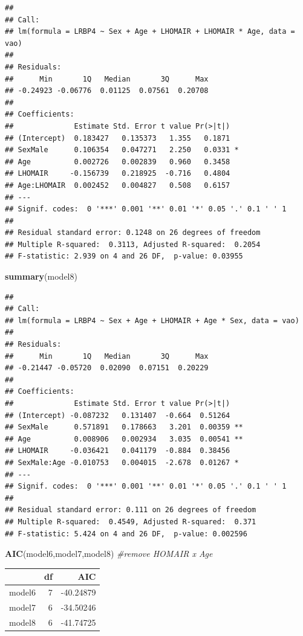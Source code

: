 \documentclass[
]{article}
\newenvironment{Shaded}{\begin{snugshade}}{\end{snugshade}}
\newcommand{\CommentTok}[1]{\textcolor[rgb]{0.56,0.35,0.01}{\textit{#1}}}
\newcommand{\FunctionTok}[1]{\textcolor[rgb]{0.13,0.29,0.53}{\textbf{#1}}}
\newcommand{\NormalTok}[1]{#1}
\begin{document}
\begin{verbatim}
## 
## Call:
## lm(formula = LRBP4 ~ Sex + Age + LHOMAIR + LHOMAIR * Age, data = vao)
## 
## Residuals:
##      Min       1Q   Median       3Q      Max 
## -0.24923 -0.06776  0.01125  0.07561  0.20708 
## 
## Coefficients:
##              Estimate Std. Error t value Pr(>|t|)  
## (Intercept)  0.183427   0.135373   1.355   0.1871  
## SexMale      0.106354   0.047271   2.250   0.0331 *
## Age          0.002726   0.002839   0.960   0.3458  
## LHOMAIR     -0.156739   0.218925  -0.716   0.4804  
## Age:LHOMAIR  0.002452   0.004827   0.508   0.6157  
## ---
## Signif. codes:  0 '***' 0.001 '**' 0.01 '*' 0.05 '.' 0.1 ' ' 1
## 
## Residual standard error: 0.1248 on 26 degrees of freedom
## Multiple R-squared:  0.3113, Adjusted R-squared:  0.2054 
## F-statistic: 2.939 on 4 and 26 DF,  p-value: 0.03955
\end{verbatim}

\begin{Shaded}
\begin{Highlighting}[]
\FunctionTok{summary}\NormalTok{(model8)}
\end{Highlighting}
\end{Shaded}

\begin{verbatim}
## 
## Call:
## lm(formula = LRBP4 ~ Sex + Age + LHOMAIR + Age * Sex, data = vao)
## 
## Residuals:
##      Min       1Q   Median       3Q      Max 
## -0.21447 -0.05720  0.02090  0.07151  0.20229 
## 
## Coefficients:
##              Estimate Std. Error t value Pr(>|t|)   
## (Intercept) -0.087232   0.131407  -0.664  0.51264   
## SexMale      0.571891   0.178663   3.201  0.00359 **
## Age          0.008906   0.002934   3.035  0.00541 **
## LHOMAIR     -0.036421   0.041179  -0.884  0.38456   
## SexMale:Age -0.010753   0.004015  -2.678  0.01267 * 
## ---
## Signif. codes:  0 '***' 0.001 '**' 0.01 '*' 0.05 '.' 0.1 ' ' 1
## 
## Residual standard error: 0.111 on 26 degrees of freedom
## Multiple R-squared:  0.4549, Adjusted R-squared:  0.371 
## F-statistic: 5.424 on 4 and 26 DF,  p-value: 0.002596
\end{verbatim}

\begin{Shaded}
\begin{Highlighting}[]
\FunctionTok{AIC}\NormalTok{(model6,model7,model8) }\CommentTok{\#remove HOMAIR x Age }
\end{Highlighting}
\end{Shaded}

\begin{longtable}[]{@{}lrr@{}}
\toprule\noalign{}
& df & AIC \\
\midrule\noalign{}
\endhead
\bottomrule\noalign{}
\endlastfoot
model6 & 7 & -40.24879 \\
model7 & 6 & -34.50246 \\
model8 & 6 & -41.74725 \\
\end{longtable}
\end{document}
